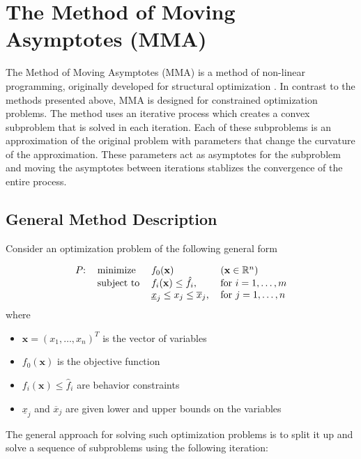 \section{The Method of Moving Asymptotes (MMA)}\label{sec:MMA}

The Method of Moving Asymptotes (MMA) is a method of non-linear programming, originally developed for structural optimization \cite{Svanberg1987}. In contrast to the methods presented above, MMA is designed for constrained optimization problems. The method uses an iterative process which creates a convex subproblem that is solved in each iteration. Each of these subproblems is an approximation of the original problem with parameters that change the curvature of the approximation. These parameters act as asymptotes for the subproblem and moving the asymptotes between iterations stablizes the convergence of the entire process.

\subsection{General Method Description}
Consider an optimization problem of the following general form

\begin{equation}
	\begin{tabular}{llll}
		$P$: & minimize   & $f_0(\mathbf{x})$                                & $\left(\mathbf{x}\in\mathbb{R}^n\right)$ \\
		     & subject to & $f_i(\mathbf{x})\leq\hat{f}_i$,                  & for $i=1,\ldots,m$                    \\
		     &            & $\underline{x}_j\leq x_j\leq \overline{x}_j$, & for $j=1,\ldots,n$                    
	\end{tabular}
\end{equation}
where
\begin{itemize}
	\item $\mathbf{x}=\left(x_1,\ldots,x_n\right)^T$ is the vector of variables
	\item $f_0(\mathbf{x})$ is the objective function
	\item $f_i(\mathbf{x})\leq\hat{f}_i$ are behavior constraints
	\item $\underline{x}_j$ and $\overline{x}_j$ are given lower and upper bounds on the variables
\end{itemize}

The general approach for solving such optimization problems is to split it up and solve a sequence of subproblems using the following iteration:


